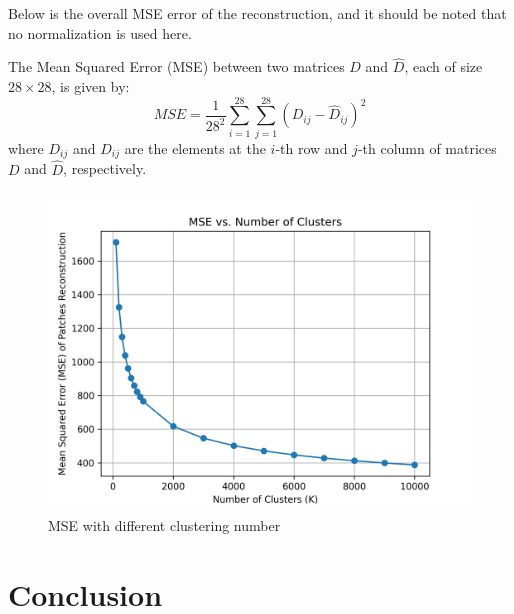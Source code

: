 \documentclass{article}
\begin{document}
Below is the overall MSE error of the reconstruction, and it should be noted that no normalization is used here. 

The Mean Squared Error (MSE) between two matrices \( D \) and \( \hat{D} \), each of size \( 28 \times 28 \), is given by:
\[
MSE = \frac{1}{28^2} \sum_{i=1}^{28} \sum_{j=1}^{28} (D_{ij} - \hat{D}_{ij})^2
\]
where \( D_{ij} \) and \( \hat{D}_{ij} \) are the elements at the \( i \)-th row and \( j \)-th column of matrices \( D \) and \( \hat{D} \), respectively.

\begin{figure}[htbp!]
    \centering
    \includegraphics[width = 0.6 \textwidth]{K-means/Result/Patches/MSE_vs_K.png}
    \caption{MSE with different clustering number}
    \label{fig:enter-label}
\end{figure}
\section{Conclusion}


\end{document}
